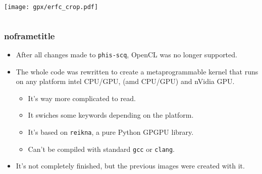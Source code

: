 \documentclass[aspectratio=43]{beamer}
\begin{document}
\begin{frame}[default]
\begin{columns}
\begin{column}{0.48\textwidth}
    \begin{center}
      \texttt{[image: gpx/erfc\_crop.pdf]}
    \end{center}

  \end{column}

\end{columns}





\end{frame}



\begin{frame}[default]
\frametitle{noframetitle}

\begin{itemize}
  \item After all changes made to \texttt{phis-scq}, OpenCL was no longer supported.
  \item The whole code was rewritten to create a metaprogrammable kernel that runs on any platform intel CPU/GPU, (amd CPU/GPU) and nVidia GPU.
  \begin{itemize}
    \item It's way more complicated to read.
    \item It swiches some keywords depending on the platform.
    \item It's based on \texttt{reikna}, a pure Python GPGPU library.
    \item Can't be compiled with standard \texttt{gcc} or \texttt{clang}.
  \end{itemize}
  \item It's not completely finished, but the previous images were created with it.
\end{itemize}

\end{frame}



\end{document}
